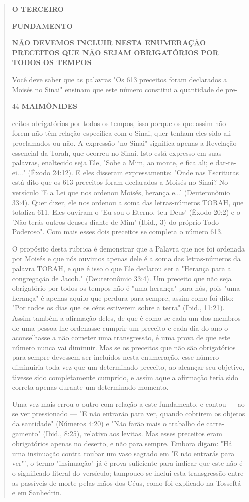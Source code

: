 \begin{quote}
\textbf{O TERCEIRO}

\textbf{FUNDAMENTO}

\textbf{NÃO DEVEMOS INCLUIR NESTA ENUMERAÇÃO PRECEITOS QUE NÃO SEJAM
OBRIGATÓRIOS POR TODOS OS TEMPOS}

Você deve saber que as palavras "Os 613 preceitos foram declara­dos a
Moisés no Sinai" ensinam que este número constitui a quantidade de pre-

44 \textbf{MAIMÔNIDES}

ceitos obrigatórios por todos os tempos, isso porque os que assim não
forem não têm relação específica com o Sinai, quer tenham eles sido ali
proclamados ou não. A expressão "no Sinai" significa apenas a Revelação
essencial da Torah, que ocorreu no Sinai. Isto está expresso em suas
palavras, enaltecido seja Ele, "Sobe a Mim, ao monte, e fica ali; e
dar-te-ei..." (Êxodo 24:12). E eles disseram expressamente: "Onde nas
Escrituras está dito que os 613 preceitos foram de­clarados a Moisés no
Sinai? No versículo 'E a Lei que nos ordenou Moisés, heran­ça e...'
(Deuteronômio 33:4). Quer dizer, ele nos ordenou a soma das
letras-nú­meros TORAH, que totaliza 611. Eles ouviram o 'Eu sou o
Eterno, teu Deus' (Êxo­do 20:2) e o 'Não terás outros deuses diante de
Mim' (Ibid., 3) do próprio Todo Poderoso". Com mais esses dois preceitos
se completa o número 613.

O propósito desta rubrica é demonstrar que a Palavra que nos foi
ordenada por Moisés e que nós ouvimos apenas dele é a soma das
letras-núme­ros da palavra TORAH, e que é isso o que Ele declarou ser a
"Herança para a congregação de Jacob." (Deuteronômio 33:4). Um preceito
que não seja obri­gatório por todos os tempos não é "uma herança" para
nós, pois "uma heran­ça" é apenas aquilo que perdura para sempre, assim
como foi dito: "Por todos os dias que os céus estiverem sobre a terra"
(Ibid., 11:21). Assim também a afir­mação deles, de que é como se cada
um dos membros de uma pessoa lhe orde­nasse cumprir um preceito e cada
dia do ano o aconselhasse a não cometer uma transgressão, é uma prova de
que este número nunca vai diminuir. Mas se os preceitos que não são
obrigatórios para sempre devessem ser incluídos nesta enumeração, esse
número diminuiria toda vez que um determinado preceito, ao alcançar seu
objetivo, tivesse sido completamente cumprido, e assim aquela afirmação
teria sido correta apenas durante um determinado momento.

Uma vez mais errou o outro com relação a este fundamento, e con­tou ---
ao se ver pressionado --- "E não entrarão para ver, quando cobrirem os
objetos da santidade" (Números 4:20) e "Não farão mais o trabalho de
carre­gamento" (Ibid., 8:25), relativo aos levitas. Mas esses preceitos
eram obrigató­rios apenas no deserto, e não para sempre. Embora digam:
"Há uma insinuação contra roubar um vaso sagrado em 'E não entrarás para
ver"', o termo "insi­nuação" já é prova suficiente para indicar que este
não é o significado literal do versículo; tampouco se inclui esta
transgressão entre as passíveis de morte pelas mãos dos Céus, como foi
explicado na Tosseftá e em Sanhedrin.


\end{quote}
